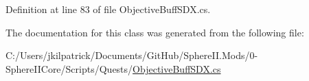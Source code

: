 Definition at line 83 of file Objective\+Buff\+S\+D\+X.\+cs.



The documentation for this class was generated from the following file\+:\begin{DoxyCompactItemize}
\item 
C\+:/\+Users/jkilpatrick/\+Documents/\+Git\+Hub/\+Sphere\+I\+I.\+Mods/0-\/\+Sphere\+I\+I\+Core/\+Scripts/\+Quests/\mbox{\hyperlink{_objective_buff_s_d_x_8cs}{Objective\+Buff\+S\+D\+X.\+cs}}\end{DoxyCompactItemize}

